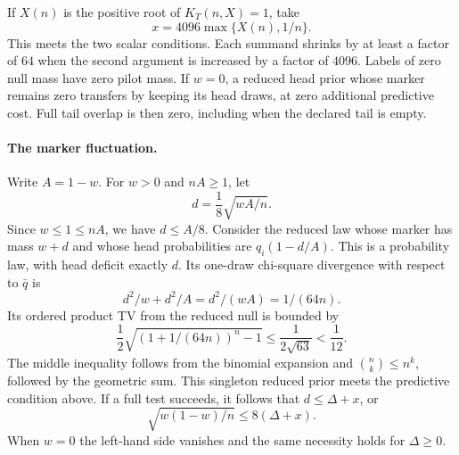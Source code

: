If \(X(n)\) is the positive root of \(K_T(n,X)=1\), take
\[
 x=4096\max\{X(n),1/n\}.
\]
This meets the two scalar conditions. Each summand shrinks by at
least a factor of \(64\) when the second argument is increased by
a factor of \(4096\). Labels of zero null mass have zero pilot mass. If \(w=0\),
a reduced head prior whose marker remains zero transfers by
keeping its head draws, at zero additional predictive cost. Full
tail overlap is then zero, including when the declared tail is
empty.

\paragraph{The marker fluctuation.}
Write \(A=1-w\). For \(w>0\) and \(nA\geq1\), let
\[
 d=\frac18\sqrt{wA/n}.
\]
Since \(w\leq1\leq nA\), we have \(d\leq A/8\).
Consider the reduced law whose marker has mass \(w+d\) and
whose head probabilities are \(q_i(1-d/A)\). This is a probability
law, with head deficit exactly \(d\). Its one-draw chi-square
divergence with respect to \(\bar q\) is
\[
 d^2/w+d^2/A=d^2/(wA)=1/(64n).
\]
Its ordered product TV from the reduced null is bounded by
\[
 \frac12\sqrt{(1+1/(64n))^n-1}
 \leq \frac{1}{2\sqrt{63}}<\frac1{12}.
\]
The middle inequality follows from the binomial expansion and
\(\binom nk\leq n^k\), followed by the geometric sum.
This singleton reduced prior meets the predictive condition
above. If a full test succeeds, it follows that \(d\leq\Delta+x\),
or
\[
 \sqrt{w(1-w)/n}\leq 8(\Delta+x).
\]
When \(w=0\) the left-hand side vanishes and the same necessity
holds for \(\Delta\geq0\).
